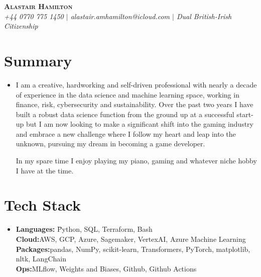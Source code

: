 \documentclass[letterpaper,11pt]{article}
\begin{document}
\vspace{-5pt}

\begin{center}
    \textbf{\Huge \scshape Alastair Hamilton} \\
    \textit{\small +44 0770 775 1450 $|$ alastair.amhamilton@icloud.com $|$ Dual British-Irish Citizenship}
    \vspace{8pt} 
\end{center}

\section{Summary}
\begin{itemize}[leftmargin=0.2in, label={}]
    \item 
        \begin{minipage}[t]{1.0\linewidth}
            I am a creative, hardworking and self-driven professional with
            nearly a decade of experience in the data science and machine
            learning space, working in finance, risk, cybersecurity and
            sustainability. Over the past two years I have 
            built a robust data science function from the ground up at a
            successful start-up but I am now looking to make a significant
            shift into the gaming industry and embrace a new challenge where
            I follow my heart and leap into the unknown, pursuing my dream in
            becoming a game developer.

            In my spare time I enjoy playing my piano, gaming and whatever 
            niche hobby I have at the time.
        \end{minipage}
\end{itemize}

\section{Tech Stack}
\begin{itemize}[leftmargin=0.2in, label={}]
    \item 
        \begin{minipage}[t]{1.0\linewidth}
            \begin{tabbing}
            \textbf{Languages:}  \=Python, SQL, Terraform, Bash \\
            \textbf{Cloud:}\>AWS, GCP, Azure, Sagemaker, VertexAI, 
            Azure Machine Learning \\
            \textbf{Packages:}\>pandas, NumPy, scikit-learn, Transformers,
            PyTorch, matplotlib, nltk, LangChain \\
            \textbf{Ops:}\>MLflow, Weights and Biases, Github, 
            Github Actions
            \end{tabbing} 
        \end{minipage}
\end{itemize}
\end{document}
